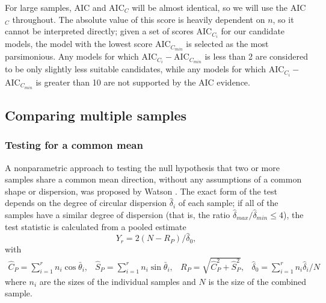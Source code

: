 \documentclass[../../ArchStats.tex]{subfiles}
\begin{document}
For large samples, AIC and AIC$_C$ will be almost identical, so we will use the AIC$_C$ throughout. The absolute value of this score is heavily dependent on $n$, so it cannot be interpreted directly; given a set of scores AIC$_{C_i}$ for our candidate models, the model with the lowest score AIC$_{C_{min}}$ is selected as the most parsimonious. Any models for which AIC$_{C_i} - $AIC$_{C_{min}}$ is less than 2 are considered to be only slightly less suitable candidates, while any models for which AIC$_{C_i} - $AIC$_{C_{min}}$ is greater than 10 are not supported by the AIC evidence.






\subsection{Comparing multiple samples}
\label{sec:similarity-tests}



\subsubsection{Testing for a common mean}
\label{sec:common-mean-test}

A nonparametric approach to testing the null hypothesis that two or more samples share a common mean direction, without any assumptions of a common shape or dispersion, was proposed by Watson .  The exact form of the test depends on the degree of circular dispersion $\hat{\delta}_i$ of each sample; if all of the samples have a similar degree of dispersion (that is, the ratio $\hat{\delta}_{max} / \hat{\delta}_{min} \leq 4$), the test statistic is calculated from a pooled estimate
\[Y_r = 2(N - R_P) / \hat{\delta}_0,\]
with
\[\begin{matrix*}
\hat{C}_P = \sum_{i=1}^r n_i \cos \bar{\theta}_i, &
\hat{S}_P = \sum_{i=1}^r n_i \sin \bar{\theta}_i, &
R_P = \sqrt{\hat{C}_P^2 + \hat{S}_P^2}, &
\hat{\delta}_0 = \sum_{i=1}^r n_i \hat{\delta}_i / N
\end{matrix*}\]
where $n_i$ are the sizes of the individual samples and $N$ is the size of the combined sample.
\end{document}
